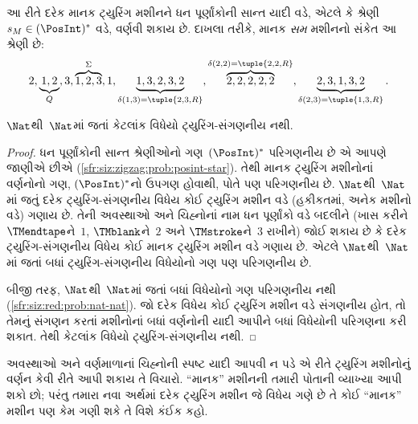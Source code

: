 \begin{explain}
આ રીતે દરેક માનક ટ્યુરિંગ મશીનને ધન પૂર્ણાંકોની સાન્ત
યાદી વડે, એટલે કે શ્રેણી $s_M \in (\PosInt)^*$ વડે,
વર્ણવી શકાય છે. દાખલા તરીકે, માનક \emph{સમ} મશીનનો
સંકેત આ શ્રેણી છે:
\[
2, \underbrace{1, 2}_Q, 3, \overbrace{1, 2, 3}^\Sigma, 1, \underbrace{1, 3, 2, 3, 2}_{\delta(1,3) = \tuple{2,3,R}},
\overbrace{2, 2, 2, 2, 2}^{\delta(2,2) = \tuple{2,2,R}},
\underbrace{2, 3, 1, 3, 2}_{\delta(2,3) = \tuple{1,3,R}}.
\]
\end{explain}

\begin{thm}
$\Nat$થી~$\Nat$માં જતાં કેટલાંક વિધેયો ટ્યુરિંગ-સંગણનીય
નથી.
\end{thm}

\begin{proof}
ધન પૂર્ણાંકોની સાન્ત શ્રેણીઓનો ગણ~$(\PosInt)^*$
પરિગણનીય છે એ આપણે જાણીએ છીએ
(\cref{sfr:siz:zigzag:prob:posint-star}). તેથી માનક
ટ્યુરિંગ મશીનોનાં વર્ણનોનો ગણ, $(\PosInt)^*$નો ઉપગણ
હોવાથી, પોતે પણ પરિગણનીય છે. $\Nat$થી~$\Nat$માં જતું
દરેક ટ્યુરિંગ-સંગણનીય વિધેય કોઈ ટ્યુરિંગ મશીન વડે
(હકીકતમાં, અનેક મશીનો વડે) ગણાય છે. તેની અવસ્થાઓ અને
ચિહ્નોનાં નામ ધન પૂર્ણાંકો વડે બદલીને (ખાસ કરીને
$\TMendtape$ને~$1$, $\TMblank$ને~$2$ અને
$\TMstroke$ને~$3$ રાખીને) જોઈ શકાય છે કે દરેક
ટ્યુરિંગ-સંગણનીય વિધેય કોઈ માનક ટ્યુરિંગ મશીન વડે
ગણાય છે. એટલે $\Nat$થી~$\Nat$માં જતાં બધાં
ટ્યુરિંગ-સંગણનીય વિધેયોનો ગણ પણ પરિગણનીય છે.

બીજી તરફ, $\Nat$થી~$\Nat$માં જતાં બધાં વિધેયોનો
ગણ પરિગણનીય નથી (\cref{sfr:siz:red:prob:nat-nat}).
જો દરેક વિધેય કોઈ ટ્યુરિંગ મશીન વડે સંગણનીય હોત,
તો તેમનું સંગણન કરતાં મશીનોનાં બધાં વર્ણનોની યાદી
આપીને બધાં વિધેયોની પરિગણના કરી શકાત. તેથી કેટલાંક
વિધેયો ટ્યુરિંગ-સંગણનીય નથી.
\end{proof}

\begin{prob}
  અવસ્થાઓ અને વર્ણમાળાનાં ચિહ્નોની સ્પષ્ટ યાદી આપવી ન
  પડે એ રીતે ટ્યુરિંગ મશીનોનું વર્ણન કેવી રીતે આપી શકાય
  તે વિચારો. ``માનક'' મશીનની તમારી પોતાની વ્યાખ્યા આપી
  શકો છો; પરંતુ તમારા નવા અર્થમાં દરેક ટ્યુરિંગ મશીન
  જે વિધેય ગણે છે તે કોઈ ``માનક'' મશીન પણ કેમ ગણી
  શકે તે વિશે કંઈક કહો.
\end{prob}
\endgroup


\begingroup
\makeatletter{}\makeatother

\label{guunit:OLP-0267}


